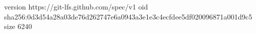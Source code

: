 version https://git-lfs.github.com/spec/v1
oid sha256:0d3d54a28a03de76d262747e6a0943a3e1e3c4ecfdee5df020096871a001d9c5
size 6240
